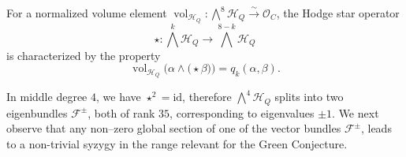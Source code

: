 \documentclass[11pt]{amsart}
\theoremstyle{definition}
\def\F{\mathcal{F}}
\def\cH{\mathcal{H}}
\begin{document}
For a normalized volume element $\operatorname{vol}_{\cH_Q}\colon \bigwedge^8\cH_Q \stackrel{\sim}{\longrightarrow} \mathcal O_C$,
the  Hodge star operator 
\[
\star\colon \bigwedge^k \cH_Q\longrightarrow \bigwedge^{8-k} \cH_Q
\]
is characterized by the property
\begin{equation}\label{eq:star-definition}
  \operatorname{vol}_{\cH_Q}\big(\alpha\wedge \bigl(\star\beta\bigr)\big)=q_k(\alpha,\beta).
\end{equation}
  

In middle degree $4$, we have $\star^2=\mathrm{id}$, therefore $\bigwedge^4 \cH_Q$ splits into two eigenbundles $\mathcal F^\pm$, both  of rank $35$, corresponding to eigenvalues $\pm 1$. We next observe that any non--zero global section of one of the vector bundles $\F^\pm$, leads to a non-trivial syzygy in the range relevant for the Green Conjecture. 
\end{document}
